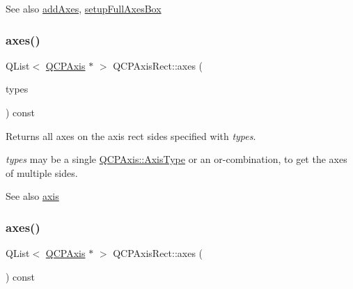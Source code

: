 \begin{DoxySeeAlso}{See also}
\mbox{\hyperlink{class_q_c_p_axis_rect_a792e1f3d9cb1591fca135bb0de9b81fc}{add\+Axes}}, \mbox{\hyperlink{class_q_c_p_axis_rect_a5fa906175447b14206954f77fc7f1ef4}{setup\+Full\+Axes\+Box}} 
\end{DoxySeeAlso}
\mbox{\label{class_q_c_p_axis_rect_a8db4722cb93e9c4a6f0d91150c200867}} 
\subsubsection{\texorpdfstring{axes()}{axes()}\hspace{0.1cm}{\footnotesize\ttfamily [1/2]}}
{\footnotesize\ttfamily Q\+List$<$ \mbox{\hyperlink{class_q_c_p_axis}{Q\+C\+P\+Axis}} $\ast$ $>$ Q\+C\+P\+Axis\+Rect\+::axes (\begin{DoxyParamCaption}\item[{Q\+C\+P\+Axis\+::\+Axis\+Types}]{types }\end{DoxyParamCaption}) const}

Returns all axes on the axis rect sides specified with {\itshape types}.

{\itshape types} may be a single \mbox{\hyperlink{class_q_c_p_axis_ae2bcc1728b382f10f064612b368bc18a}{Q\+C\+P\+Axis\+::\+Axis\+Type}} or an {\ttfamily or}-\/combination, to get the axes of multiple sides.

\begin{DoxySeeAlso}{See also}
\mbox{\hyperlink{class_q_c_p_axis_rect_a583ae4f6d78b601b732183f6cabecbe1}{axis}} 
\end{DoxySeeAlso}
\mbox{\label{class_q_c_p_axis_rect_a11657b8faebe9677180860e8057ede26}} 
\subsubsection{\texorpdfstring{axes()}{axes()}\hspace{0.1cm}{\footnotesize\ttfamily [2/2]}}
{\footnotesize\ttfamily Q\+List$<$ \mbox{\hyperlink{class_q_c_p_axis}{Q\+C\+P\+Axis}} $\ast$ $>$ Q\+C\+P\+Axis\+Rect\+::axes (\begin{DoxyParamCaption}{ }\end{DoxyParamCaption}) const}

